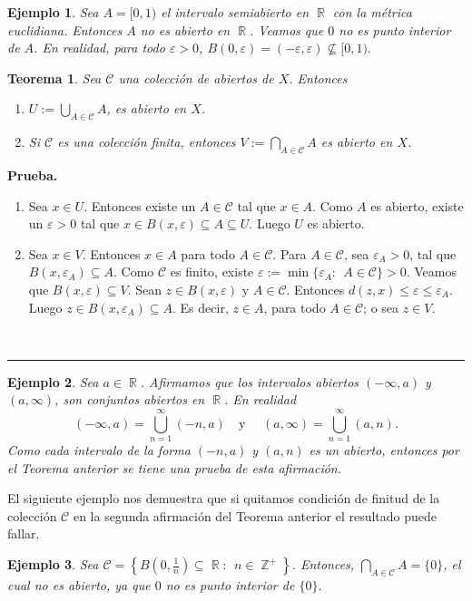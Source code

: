 \documentclass[x11names, 12pt]{book}
\newtheorem{teorema}{Teorema}
\newtheorem{example}{Ejemplo}
\newenvironment{prueba}[1][Prueba]{\noindent\textbf{#1.} }{\ \rule{0.5em}{0.5em}}
\DeclareMathOperator{\seta}{\mathbb{Z}}
\DeclareMathOperator{\R}{\mathbb{R}}
\begin{document}
\begin{example}
Sea $A=[0,1)$ el intervalo semiabierto en $\R$ con la métrica euclidiana. Entonces $A$ no es abierto en $\R$. Veamos que  $0$ no es punto interior de $A$. En realidad, para todo $\varepsilon >0$, $B(0,\varepsilon )=(-\varepsilon, \varepsilon) \not \subseteq [0,1).$
\end{example}

\begin{teorema}\label{uni-inter-ab}
Sea $\mathcal{C}$ una colección de abiertos de $X$. Entonces
\begin{enumerate}
    \item $U:=\bigcup_{A\in \mathcal{C}}A$, es abierto en $X$.
    \item Si $\mathcal{C}$ es una colección finita, entonces $V:=\bigcap_{A\in \mathcal{C}}A$ es abierto en $X$.
\end{enumerate}
\end{teorema}
\begin{prueba}
\begin{enumerate}
    \item Sea $x\in U$. Entonces existe un $A\in \mathcal{C}$ tal que $x\in A$. Como $A$ es abierto, existe un $\varepsilon>0$ tal que $x\in B(x, \varepsilon) \subseteq A \subseteq U.$ Luego $U $ es abierto.
    \item Sea $x\in V$. Entonces  $x\in A $ para todo $A\in \mathcal{C}.$ Para $A\in \mathcal{C}$, sea $\varepsilon_A >0$, tal que $B(x, \varepsilon_A)\subseteq A$. Como $\mathcal{C}$ es finito, existe $\varepsilon:=\min\{\varepsilon_A: \ \ A\in \mathcal{C} \}>0.$ Veamos que $B(x, \varepsilon)\subseteq V.$ Sean $z\in B(x, \varepsilon)$ y $A\in \mathcal{C}$. Entonces $d(z,x)\leq \varepsilon \leq \varepsilon_A$. Luego  $z\in B(x, \varepsilon_A)\subseteq A$. Es decir,  $z\in A$, para todo $A\in \mathcal{C}$; o sea $z\in V$.
\end{enumerate}
\end{prueba}

\begin{example}
Sea $a\in \R$. Afirmamos que los intervalos abiertos $(-\infty, a)$ y $(a, \infty)$, son conjuntos abiertos en $\R$. En realidad
\[(-\infty , a) = \bigcup_{n=1}^\infty (-n, a ) \quad \text{y }\quad (a, \infty ) = \bigcup_{n=1}^\infty ( a, n ) .\]
Como cada intervalo de la forma $(-n,a)$ y $(a,n)$ es un abierto, entonces por el Teorema anterior se tiene una prueba de esta afirmación.
\end{example}

El siguiente ejemplo nos demuestra que si quitamos condición de finitud de la colección $\mathcal{C}$ en la segunda afirmación del Teorema anterior el resultado puede fallar.
\begin{example}
Sea $\mathcal{C}= \left\{ B(0, \frac{1}{n})\subseteq \R: \ \ n\in \seta^+\right\}$. Entonces, $\bigcap_{A\in \mathcal{C}}A=\{0\}$, el cual no es abierto, ya que $0$ no es punto interior de $\{0\}.$
\end{example}
\end{document}
